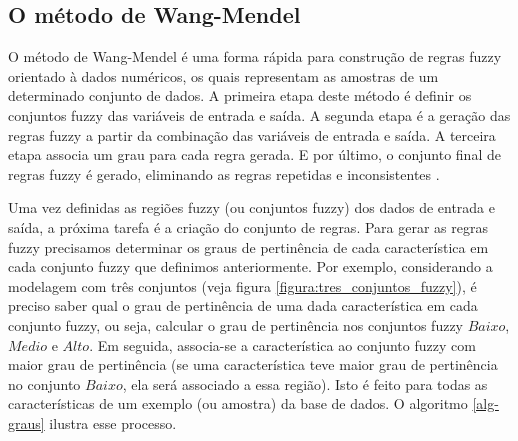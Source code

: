 \documentclass[template.tex]{subfiles}
\begin{document}
\subsection{O método de Wang-Mendel}
\label{metodo-wang-mendel}

O método de Wang-Mendel é uma forma rápida para construção de regras fuzzy orientado à dados numéricos, os quais representam as amostras de um determinado conjunto de dados. A primeira etapa deste método é definir os conjuntos fuzzy das variáveis de entrada e saída. A segunda etapa é a geração das regras fuzzy a partir da combinação das variáveis de entrada e saída. A terceira etapa associa um grau para cada regra gerada. E por último, o conjunto final de regras fuzzy é gerado, eliminando as regras repetidas e inconsistentes \cite{wang1992generating}.

Uma vez definidas as regiões fuzzy (ou conjuntos fuzzy) dos dados de entrada e saída, a próxima tarefa é a criação do conjunto de regras. Para gerar as regras fuzzy precisamos determinar os graus de pertinência de cada característica em cada conjunto fuzzy que definimos anteriormente. Por exemplo, considerando a modelagem com três conjuntos (veja figura \ref{figura:tres_conjuntos_fuzzy}), é preciso saber qual o grau de pertinência de uma dada característica em cada conjunto fuzzy, ou seja, calcular o grau de pertinência nos conjuntos fuzzy $Baixo$, $Medio$ e $Alto$. Em seguida, associa-se a característica ao conjunto fuzzy com maior grau de pertinência (se uma característica teve maior grau de pertinência no conjunto $Baixo$, ela será associado a essa região). Isto é feito para todas as características de um exemplo (ou amostra) da base de dados. O algoritmo \ref{alg-graus} ilustra esse processo.

%

\end{document}

